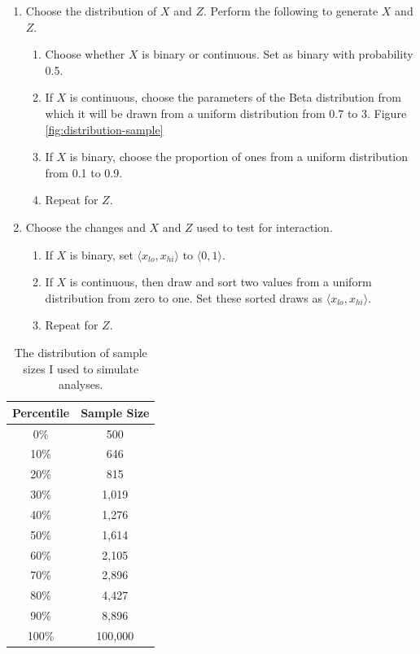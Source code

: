 \documentclass[12pt]{article}
\begin{document}
\begin{appendix}
\begin{enumerate}
        \item Choose the distribution of $X$ and $Z$. Perform the following to generate $X$ and $Z$.
                \begin{enumerate}
                \item Choose whether $X$ is binary or continuous. Set as binary with probability 0.5.
                \item If $X$ is continuous, choose the parameters of the Beta distribution from which it will be drawn from a uniform distribution from 0.7 to 3. Figure \ref{fig:distribution-sample}
                \item If $X$ is binary, choose the proportion of ones from a uniform distribution from 0.1 to 0.9.
                \item Repeat for $Z$.
                \end{enumerate}
                
        \item Choose the changes and $X$ and $Z$ used to test for interaction.
                \begin{enumerate}
                \item If $X$ is binary, set $\langle x_{lo}, x_{hi} \rangle$ to $\langle 0, 1 \rangle$.
                \item If $X$ is continuous, then draw and sort two values from a uniform distribution from zero to one. Set these sorted draws as $\langle x_{lo}, x_{hi} \rangle$.
                \item Repeat for $Z$.
                \end{enumerate}
\end{enumerate}

\begin{table}[h]
\begin{center}
\begin{tabular}{|cc|}
\hline
Percentile & Sample Size \\ 
\hline
0\% & 500 \\ 
10\% & 646 \\ 
20\% & 815 \\ 
30\% & 1,019 \\ 
40\% & 1,276 \\ 
50\% & 1,614 \\ 
60\% & 2,105 \\ 
70\% & 2,896 \\ 
80\% & 4,427 \\ 
90\% & 8,896 \\ 
100\% & 100,000 \\ 
\hline
\end{tabular}\caption{The distribution of sample sizes I used to simulate analyses.}\label{tab:n}
\end{center}
\end{table}     


\end{appendix}
\end{document}
